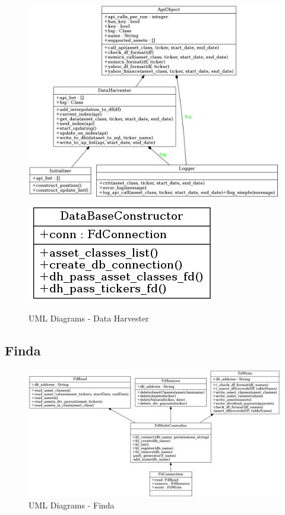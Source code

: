 \documentclass[main.tex]{subfiles}
\begin{document}
\begin{figure}[H]
   \centering
   \includegraphics[width=\textwidth,keepaspectratio]{Report/08Appendices/084UML/084Pictures/classes_dhav_core_1.png}
   \includegraphics[scale=2.0,keepaspectratio]{Report/08Appendices/084UML/084Pictures/classes_dhav_core_2.png}
   \caption{UML Diagrams - Data Harvester}
\end{figure}

\subsection{Finda}

\begin{figure}[H]
   \centering
   \includegraphics[width=\textwidth,keepaspectratio]{Report/08Appendices/084UML/084Pictures/classes_Finda.png}
   \caption{UML Diagrams - Finda}
\end{figure}
\end{document}
